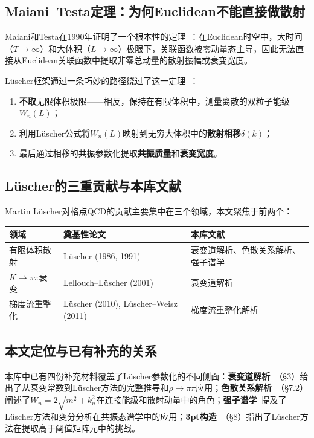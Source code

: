 \documentclass[12pt,a4paper]{ctexart}
\theoremstyle{definition}
\begin{document}
\subsection{Maiani--Testa定理：为何Euclidean不能直接做散射}

Maiani和Testa在1990年证明了一个根本性的定理~\cite{decayChannels2026,GattringerLang2010}：在Euclidean时空中，大时间（$T \to \infty$）和大体积（$L \to \infty$）极限下，关联函数被零动量态主导，因此无法直接从Euclidean关联函数中提取非零总动量的散射振幅或衰变宽度。

L\"uscher框架通过一条巧妙的路径绕过了这一定理~\cite{GattringerLang2010,decayChannels2026}：
\begin{enumerate}[leftmargin=*]
    \item \textbf{不取}无限体积极限——相反，保持在有限体积中，测量离散的双粒子能级$W_n(L)$；
    \item 利用L\"uscher公式将$W_n(L)$映射到无穷大体积中的\textbf{散射相移}$\delta(k)$；
    \item 最后通过相移的共振参数化提取\textbf{共振质量}和\textbf{衰变宽度}。
\end{enumerate}

\subsection{L\"uscher的三重贡献与本库文献}

Martin L\"uscher对格点QCD的贡献主要集中在三个领域，本文聚焦于前两个：

\begin{center}
\begin{tabular}{lll}
\toprule
\textbf{领域} & \textbf{奠基性论文} & \textbf{本库文献} \\
\midrule
有限体积散射 & L\"uscher (1986, 1991)~\cite{GattringerLang2010} & 衰变道解析、色散关系解析、强子谱学 \\
$K\to\pi\pi$衰变 & Lellouch--L\"uscher (2001)~\cite{decayChannels2026} & 衰变道解析 \\
梯度流重整化 & L\"uscher (2010), L\"uscher--Weisz (2011)~\cite{gradFlow2026} & 梯度流重整化解析 \\
\bottomrule
\end{tabular}
\end{center}

\subsection{本文定位与已有补充的关系}

本库中已有四份补充材料覆盖了L\"uscher参数化的不同侧面：\textbf{衰变道解析}~\cite{decayChannels2026}（§3）给出了从衰变常数到L\"uscher方法的完整推导和$\rho\to\pi\pi$应用；\textbf{色散关系解析}~\cite{dispersion2026}（§7.2）阐述了$W_n = 2\sqrt{m^2 + k_n^2}$在连接能级和散射动量中的角色；\textbf{强子谱学}~\cite{hadronSpectroscopy2026}提及了L\"uscher方法和变分分析在共振态谱学中的应用；\textbf{3pt构造}~\cite{threepoint2026}（§8）指出了L\"uscher方法在提取高于阈值矩阵元中的挑战。
\end{document}
